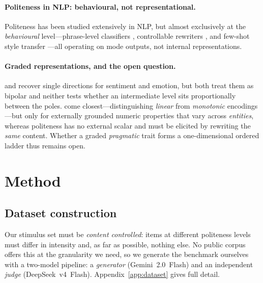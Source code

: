 \documentclass{article}
\begin{document}
\paragraph{Politeness in NLP: behavioural, not representational.}
Politeness has been studied extensively in NLP, but almost exclusively at the
\emph{behavioural} level---phrase-level classifiers \citep{danescu2013computational},
controllable rewriters \citep{niu2018polite,madaan2020politeness}, and few-shot
style transfer \citep{reif2022recipe}---all operating on mode outputs, not internal
representations.

\paragraph{Graded representations, and the open question.}
 \citet{tigges2023linear} and \citet{konen2024} recover single directions for sentiment and emotion, but both treat them as bipolar and neither tests whether an intermediate level sits proportionally between the poles. \citet{heinzerling2024} come closest---distinguishing \emph{linear} from \emph{monotonic} encodings---but only for externally grounded numeric properties that vary across \emph{entities}, whereas politeness has no external scalar and must be elicited by rewriting the \emph{same} content. Whether a graded \emph{pragmatic} trait forms a one-dimensional ordered ladder thus remains open.

\section{Method}\label{sec:method}

\subsection{Dataset construction}
\label{subsec:dataset}

Our stimulus set must be \emph{content controlled}: items at different politeness
levels must differ in intensity and, as far as possible, nothing else. No public
corpus offers this at the granularity we need, so we generate the benchmark
ourselves with a two-model pipeline: a \emph{generator} (Gemini~2.0~Flash) and an
independent \emph{judge} (DeepSeek~v4~Flash). Appendix~\ref{app:dataset} gives full detail.
\end{document}
